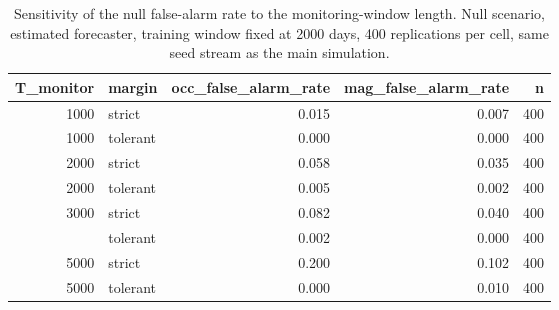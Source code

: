 \begin{table}

\caption{Sensitivity of the null false-alarm rate to the monitoring-window length. Null scenario, estimated forecaster, training window fixed at 2000 days, 400 replications per cell, same seed stream as the main simulation.}
\centering
\begin{tabular}[t]{rlrrr}
\toprule
T\_monitor & margin & occ\_false\_alarm\_rate & mag\_false\_alarm\_rate & n\\
\midrule
1000 & strict & 0.015 & 0.007 & 400\\
1000 & tolerant & 0.000 & 0.000 & 400\\
2000 & strict & 0.058 & 0.035 & 400\\
2000 & tolerant & 0.005 & 0.002 & 400\\
3000 & strict & 0.082 & 0.040 & 400\\
\addlinespace
3000 & tolerant & 0.002 & 0.000 & 400\\
5000 & strict & 0.200 & 0.102 & 400\\
5000 & tolerant & 0.000 & 0.010 & 400\\
\bottomrule
\end{tabular}
\end{table}

